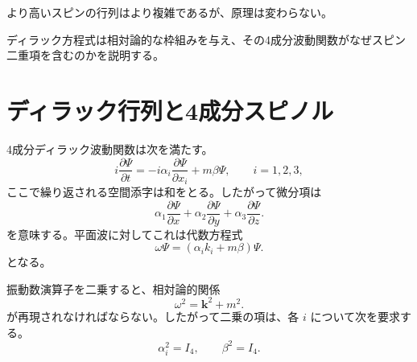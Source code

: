 より高いスピンの行列はより複雑であるが、原理は変わらない。

\begin{classroomqa}
\end{classroomqa}

\begin{classroomqa}
\end{classroomqa}

ディラック方程式は相対論的な枠組みを与え、その4成分波動関数がなぜスピン二重項を含むのかを説明する。

\section{ディラック行列と4成分スピノル}

4成分ディラック波動関数は次を満たす。
\begin{equation}
i\frac{\partial\Psi}{\partial t}
=
-i\alpha_i\frac{\partial\Psi}{\partial x_i}
+m\beta\Psi,
\qquad i=1,2,3,
\end{equation}
ここで繰り返される空間添字は和をとる。したがって微分項は
\begin{equation}
\alpha_1\frac{\partial\Psi}{\partial x}
+\alpha_2\frac{\partial\Psi}{\partial y}
+\alpha_3\frac{\partial\Psi}{\partial z}.
\end{equation}
を意味する。平面波に対してこれは代数方程式
\begin{equation}
\omega\Psi=(\alpha_i k_i+m\beta)\Psi.
\end{equation}
となる。

\begin{classroomqa}
\end{classroomqa}

振動数演算子を二乗すると、相対論的関係
\begin{equation}
\omega^2=\mathbf{k}^2+m^2.
\end{equation}
が再現されなければならない。したがって二乗の項は、各 \(i\) について次を要求する。
\begin{equation}
\alpha_i^2=I_4,
\qquad
\beta^2=I_4.
\end{equation}

